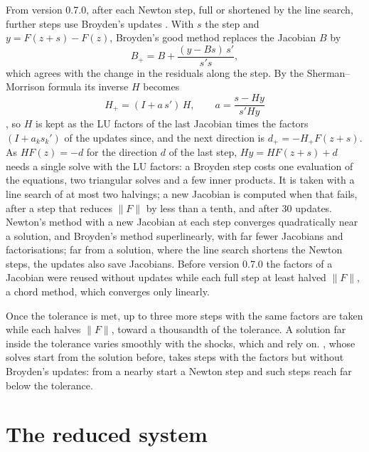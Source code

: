 From version 0.7.0, after each Newton step, full or shortened by the line
search, further steps use Broyden's updates \citep{broyden1965}. With $s$ the
step and $y = F(z + s) - F(z)$, Broyden's good method replaces the Jacobian
$B$ by
\begin{equation*}
B_+ = B + \frac{(y - B s)\, s'}{s' s},
\end{equation*}
which agrees with the change in the residuals along the step. By the
Sherman--Morrison formula its inverse $H$ becomes
\begin{equation*}
H_+ = (I + a\, s')\, H, \qquad a = \frac{s - H y}{s' H y}
\end{equation*}
\citep[chapter~7]{kelley1995}, so $H$ is kept as the LU factors of the last
Jacobian times the factors $(I + a_k s_k')$ of the updates since, and the next
direction is $d_+ = -H_+ F(z + s)$. As $H F(z) = -d$ for the direction $d$ of
the last step, $H y = H F(z + s) + d$ needs a single solve with the LU
factors: a Broyden step costs one evaluation of the equations, two triangular
solves and a few inner products. It is taken with a line search of at most
two halvings; a new Jacobian is computed when that fails, after a step that
reduces $\lVert F\rVert$ by less than a tenth, and after 30 updates. Newton's
method with a new Jacobian at each step converges quadratically near a
solution, and Broyden's method superlinearly, with far fewer Jacobians and
factorisations; far from a solution, where the line search shortens the
Newton steps, the updates also save Jacobians. Before version 0.7.0 the
factors of a Jacobian were reused without updates while each full step at
least halved $\lVert F\rVert$, a chord method, which converges only
linearly.

Once the tolerance is met, up to three more steps with the same factors are
taken while each halves $\lVert F\rVert$, toward a thousandth of the
tolerance. A solution far inside the tolerance varies smoothly with the
shocks, which  and  rely on.
, whose solves start from the solution before, takes
steps with the factors but without Broyden's updates: from a nearby start a
Newton step and such steps reach far below the tolerance.

\section{The reduced system}\label{sec:reduced}

